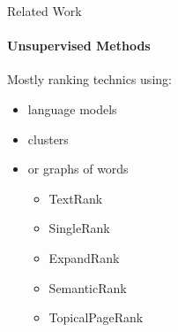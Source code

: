   \begin{frame}{Related Work}
    \framesubtitle{Unsupervised Methods}

    Mostly ranking technics using:
    \begin{itemize}
      \item{language models~\cite{tomokiyo2003languagemodel}}
      \item{clusters~\cite{liu2009keycluster}}
      \item{or graphs of words}
      \begin{itemize}
        [triangle]
        \item<2->{TextRank~\cite{mihalcea2004textrank}}
        \item<2->{SingleRank~\cite{wan2008expandrank}}
        \item<2->{ExpandRank~\cite{wan2008expandrank}}
        \item<2->{SemanticRank~\cite{tsatsaronis2010semanticrank}}
        \item<2->{TopicalPageRank~\cite{liu2010topicalpagerank}}
      \end{itemize}
    \end{itemize}
  \end{frame}

